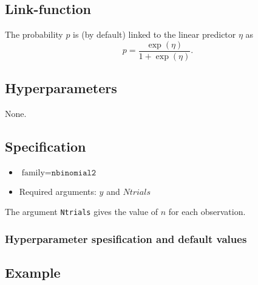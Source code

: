 \documentclass[a4paper,11pt]{article}
\begin{document}
\subsection*{Link-function}

The probability $p$ is (by default) linked to the linear predictor
$\eta$ as
\begin{displaymath}
    p = \frac{\exp(\eta)}{1+\exp(\eta)}.
\end{displaymath}

\subsection*{Hyperparameters}
None.

\subsection*{Specification}

\begin{itemize}
\item $\text{family}=\texttt{nbinomial2}$
\item Required arguments: $y$ and $Ntrials$
\end{itemize}
The argument \texttt{Ntrials} gives the value of $n$ for each
observation.

\subsubsection*{Hyperparameter spesification and default values}


\subsection*{Example}

\end{document}
